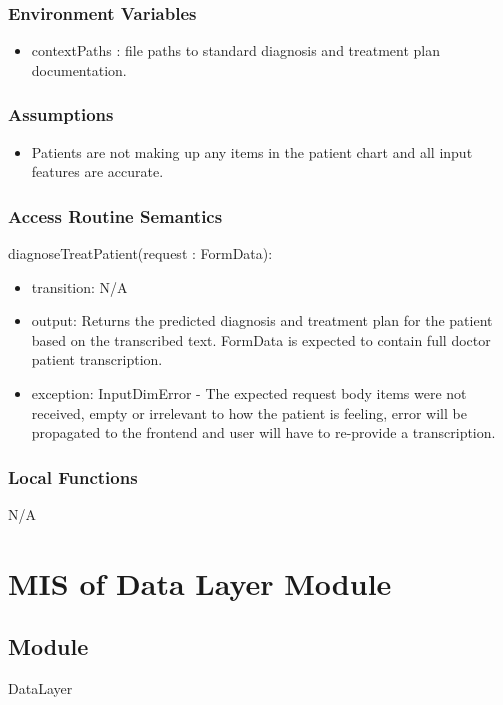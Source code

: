 \documentclass[12pt, titlepage]{article}
\begin{document}
\subsubsection{Environment Variables}
\begin{itemize}
  \item contextPaths : file paths to standard diagnosis and treatment plan documentation.
\end{itemize}

\subsubsection{Assumptions}

\begin{itemize}
  \item Patients are not making up any items in the patient chart and all input features are accurate.

\end{itemize}

\subsubsection{Access Routine Semantics}

\noindent diagnoseTreatPatient(request : FormData):
\begin{itemize}
\item transition: N/A
\item output: Returns the predicted diagnosis and treatment plan for the patient based on the transcribed text. FormData is expected to contain full doctor patient transcription.
\item exception: InputDimError - The expected request body items were not received, empty or irrelevant to how the patient is feeling, error will be propagated to the frontend and user will have to re-provide a transcription.
\end{itemize}


\subsubsection{Local Functions}
N/A


\newpage

\section{MIS of Data Layer Module} \label{Module_DataLayer}

\subsection{Module}
DataLayer
\end{document}
